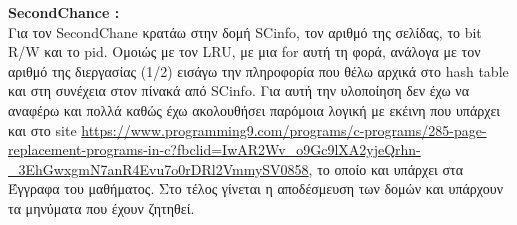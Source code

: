 \documentclass[12pt]{article}
\begin{document}
    \textbf{SecondChance : \\}
    Για τον SecondChane κρατάω στην δομή SCinfo, τον αριθμό της σελίδας, το bit R/W και το pid. Ομοιώς με τον LRU, με μια for αυτή τη φορά,
    ανάλογα με τον αριθμό της διεργασίας (1/2) εισάγω την πληροφορία που θέλω αρχικά στο hash table και στη συνέχεια στον πίνακά από SCinfo.
    Για αυτή την υλοποίηση δεν έχω να αναφέρω και πολλά καθώς έχω ακολουθήσει παρόμοια λογική με εκέινη που υπάρχει και στο site 
    \url{https://www.programming9.com/programs/c-programs/285-page-replacement-programs-in-c?fbclid=IwAR2Wv_o9Gc9lXA2yjeQrhn-_3EhGwxgmN7anR4Evu7o0rDRl2VmmySV0858}, 
    το οποίο και υπάρχει στα Έγγραφα του μαθήματος. Στο τέλος γίνεται η αποδέσμευση των δομών και υπάρχουν τα μηνύματα που έχουν ζητηθεί.
\end{document}
